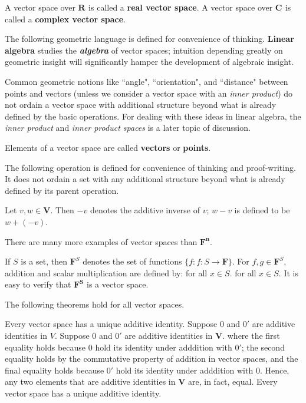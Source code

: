 \documentclass[11pt]{article} %
\newcommand\R[1]{\mathbf{R^{#1}}}
\newcommand\C[1]{\mathbf{C^{#1}}}
\newcommand\F[1]{\mathbf{F^{#1}}}
\newcommand\V{\mathbf{V}}
\begin{document}
{
\points
{A vector space over $\R{}$ is called a \textbf{real vector space}.}
{A vector space over $\C{}$ is called a \textbf{complex vector space}.}
}

The following geometric language is defined for convenience of thinking. \textbf{Linear algebra} studies the \textit{\textbf{algebra}} of vector spaces; intuition depending greatly on geometric insight will significantly hamper the development of algebraic insight. 

\clearpage

Common geometric notions  like ``angle", ``orientation", and ``distance" between points and vectors (unless we consider a vector space with an \textit{inner product})  do not ordain a vector space with additional structure beyond what is already defined by the basic operations. For dealing with these ideas in linear algebra, the \textit{inner product} and \textit{inner product spaces} is a later topic of discussion.

{Elements of a vector space are called \textbf{vectors} or \textbf{points}.}

The following operation is defined for convenience of thinking and proof-writing. It does not ordain a set with any additional structure beyond what is already defined by its parent operation.

{
Let $v, w \in \V$. Then 
	\points
	{$-v$ denotes the additive inverse of $v$;}
	{$w-v$ is defined to be $w + (-v)$.}
}

There are many more examples of vector spaces than $\F{n}$.

\definition{$\F{S}$}
{
If $S$ is a set, then $\mathbf{F}^S$ denotes the set of functions $\{ f : f : S \rightarrow \mathbf{F}\}$. For $f, g \in \mathbf{F}^S$, addition and scalar multiplication are defined by:
	\points
	{    for all $x \in S$.}
	{    for all $x \in S$.}
It is easy to verify that $\F{S}$ is a vector space.
}

The following theorems hold for all vector spaces.


{Every vector space has a unique additive identity.}
{
Suppose $0$ and $0'$ are additive identities in $V$.
Suppose $0$ and $0'$ are additive identities in $\V$.
where the first equality holds because $0$ hold its identity under adddition with $0'$; the second equality holds by the commutative property of addition in vector spaces, and the final equality holds because $0'$ hold its identity under adddition with $0$. Hence, any two elements that are additive identities in $\V$ are, in fact, equal. Every vector space has a unique additive identity.
}
\clearpage
\end{document}
